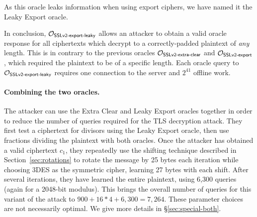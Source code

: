 As this oracle leaks information when using export ciphers,
we have named it the Leaky Export oracle.

In conclusion, $\mathcal{O}_\textsf{SSLv2-export-leaky}$ allows an attacker to obtain a valid oracle response
for all ciphertexts which decrypt to a correctly-padded plaintext of \textit{any} length. This is in contrary to the previous oracles $\mathcal{O}_\textsf{SSLv2-extra-clear}$ and $\mathcal{O}_\textsf{SSLv2-export}$, which required the plaintext to be of a specific length.
Each oracle query to $\mathcal{O}_\textsf{SSLv2-export-leaky}$ requires one connection to the server
and $2^{41}$ offline work.


\paragraph{Combining the two oracles.}
\label{sec:special_drown_summary}

The attacker can use the Extra Clear and Leaky Export oracles
together in order to reduce the number of queries required for the TLS decryption attack.
They first test a \tlsconform ciphertext for divisors using the Leaky Export oracle, then use fractions dividing the plaintext with both oracles.
Once the attacker has obtained a valid \ssltwo ciphertext $c_1$, they repeatedly
use the shifting technique described in Section~\ref{sec:rotations} to rotate
the message by 25 bytes each iteration while choosing 3DES as the
symmetric cipher, learning 27 bytes with each shift.  After several iterations,
they have learned the entire plaintext, using 6,300 queries (again for a 2048-bit
modulus).
This brings the overall number of queries for this variant of the attack to
$ 900 + 16 * 4 + 6,300 = 7,264 $.
These parameter choices are not necessarily optimal.  We give more details in \S\ref{sec:special-both}.
